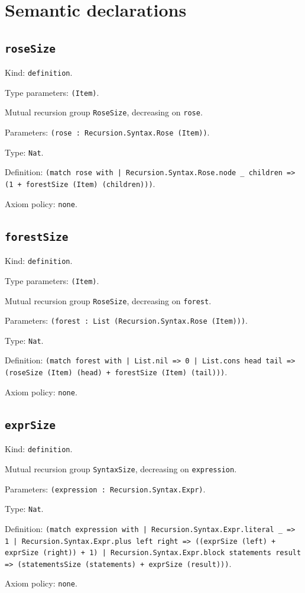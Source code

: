 \documentclass[11pt]{article}
\begin{document}
\section*{Semantic declarations}
\subsection*{\texttt{roseSize}}
\noindent Kind: \texttt{definition}.\par
\noindent Type parameters: \texttt{(Item)}.\par
\noindent Mutual recursion group \texttt{RoseSize}, decreasing on \texttt{rose}.\par
\noindent Parameters: \texttt{(rose : Recursion.Syntax.Rose (Item))}.\par
\noindent Type: \texttt{Nat}.\par
\noindent Definition: \texttt{(match rose with | Recursion.Syntax.Rose.node \_ children => (1 + forestSize (Item) (children)))}.\par
\noindent Axiom policy: \texttt{none}.\par
\subsection*{\texttt{forestSize}}
\noindent Kind: \texttt{definition}.\par
\noindent Type parameters: \texttt{(Item)}.\par
\noindent Mutual recursion group \texttt{RoseSize}, decreasing on \texttt{forest}.\par
\noindent Parameters: \texttt{(forest : List (Recursion.Syntax.Rose (Item)))}.\par
\noindent Type: \texttt{Nat}.\par
\noindent Definition: \texttt{(match forest with | List.nil => 0 | List.cons head tail => (roseSize (Item) (head) + forestSize (Item) (tail)))}.\par
\noindent Axiom policy: \texttt{none}.\par
\subsection*{\texttt{exprSize}}
\noindent Kind: \texttt{definition}.\par
\noindent Mutual recursion group \texttt{SyntaxSize}, decreasing on \texttt{expression}.\par
\noindent Parameters: \texttt{(expression : Recursion.Syntax.Expr)}.\par
\noindent Type: \texttt{Nat}.\par
\noindent Definition: \texttt{(match expression with | Recursion.Syntax.Expr.literal \_ => 1 | Recursion.Syntax.Expr.plus left right => ((exprSize (left) + exprSize (right)) + 1) | Recursion.Syntax.Expr.block statements result => (statementsSize (statements) + exprSize (result)))}.\par
\noindent Axiom policy: \texttt{none}.\par
\end{document}
